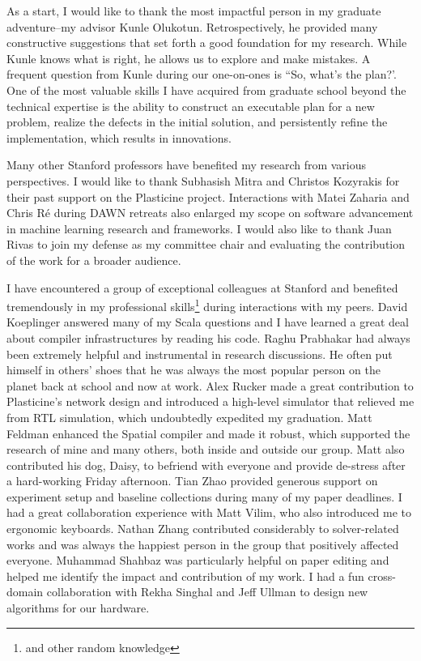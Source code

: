 
As a start, I would like to thank the most impactful person in my graduate adventure--my advisor
Kunle Olukotun.
Retrospectively, he provided many constructive suggestions that set forth a good foundation for my research.
While Kunle knows what is right, he allows us to explore and make mistakes.
A frequent question from Kunle during our one-on-ones is ``So, what's the plan?'.
One of the most valuable skills I have acquired from graduate school beyond the technical expertise is the ability to construct an executable plan for a new problem, realize the defects in the initial solution, and persistently refine the implementation, which results in innovations.

Many other Stanford professors have benefited my research from various perspectives.
I would like to thank Subhasish Mitra and Christos Kozyrakis for their past support on the
Plasticine project.
Interactions with Matei Zaharia and Chris R\'e during DAWN retreats also enlarged my scope on 
software advancement in machine learning research and frameworks.
I would also like to thank Juan Rivas to join my defense as my committee chair and evaluating the
contribution of the work for a broader audience.

I have encountered a group of exceptional colleagues at Stanford and
benefited tremendously in my professional skills\footnote{and other random knowledge} during interactions with my peers.
David Koeplinger answered many of my Scala questions and I have learned a great deal about compiler
infrastructures by reading his code.
Raghu Prabhakar had always been extremely helpful and instrumental in research discussions. 
He often put himself in others' shoes that he was always the most popular person on the planet back at school and now at work.
Alex Rucker made a great contribution to Plasticine's network design and introduced a high-level simulator that relieved me from RTL simulation, which undoubtedly expedited my graduation.
Matt Feldman enhanced the Spatial compiler and made it robust, which supported the research of mine and many
others, both inside and outside our group.
Matt also contributed his dog, Daisy, to befriend with everyone and 
provide de-stress after a hard-working Friday afternoon.
Tian Zhao provided generous support on experiment setup and baseline collections during many of my paper deadlines.
I had a great collaboration experience with Matt Vilim, who also introduced me to ergonomic keyboards.
Nathan Zhang contributed considerably to solver-related works and was always the happiest person in the group that positively affected everyone.
Muhammad Shahbaz was particularly helpful on paper editing and helped me identify the impact and contribution of my work.
I had a fun cross-domain collaboration with Rekha Singhal and Jeff Ullman to design new algorithms for our
hardware.

